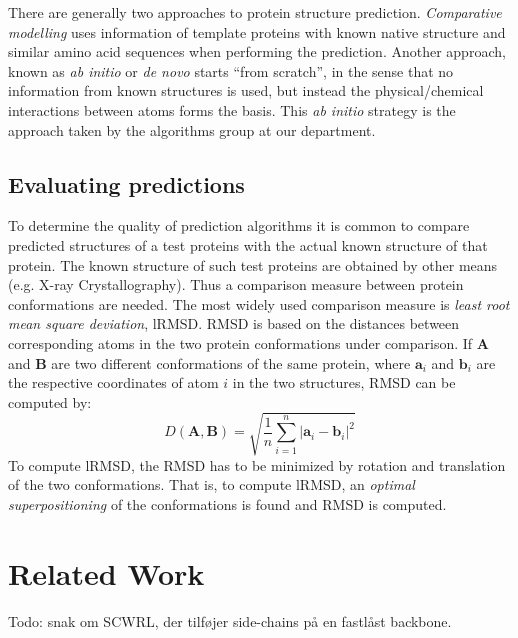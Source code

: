 \documentclass[10pt,a4paper,final,oneside,openany,article,twocolumn]{memoir}
\renewcommand\vec[1]{\boldsymbol{#1}}
\begin{document}

There are generally two approaches to protein structure prediction.
\textit{Comparative modelling} uses information of template proteins
with known native structure and similar amino acid sequences when
performing the prediction. Another approach, known as \textit{ab
  initio} or \textit{de novo} starts ``from scratch'', in the sense
that no information from known structures is used, but instead the
physical/chemical interactions between atoms forms the basis. This
\textit{ab initio} strategy is the approach taken by the algorithms
group at our department.


\subsection{Evaluating predictions}
To determine the quality of prediction algorithms it is common 
to compare predicted structures of a test proteins with the actual
known structure of that protein. The known structure of such test
proteins are obtained by other means (e.g. X-ray Crystallography).
Thus a comparison measure between protein conformations are
needed. The most widely used comparison measure is \textit{least root mean
  square deviation}, lRMSD. RMSD is based on the distances between
corresponding atoms in the two protein conformations under comparison.
If $\vec{A}$ and $\vec{B}$ are two different conformations of the same protein,
where $\vec{a}_i$ and $\vec{b}_i$ are the respective coordinates of atom $i$ in the two
structures, RMSD can be computed by:
\begin{equation}
  \label{eq:rmsd}
  D(\vec{A}, \vec{B}) = \sqrt{\frac{1}{n}\sum_{i=1}^n |\vec{a}_i - \vec{b}_i|^2}
\end{equation}
To compute lRMSD, the RMSD has to be minimized by rotation and
translation of the two conformations. That is, to compute lRMSD, an
\textit{optimal superpositioning} of the conformations is found and
RMSD is computed.




\section{Related Work}
Todo: snak om SCWRL, der tilføjer side-chains på en fastlåst backbone.
\end{document}
